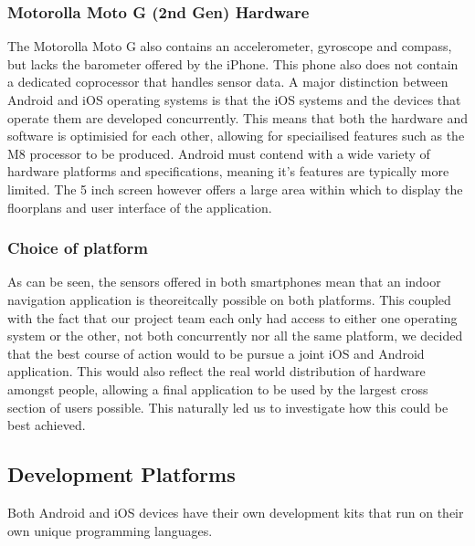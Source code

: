 \documentclass[main.tex]{subfiles}
\begin{document}
\subsubsection{Motorolla Moto G (2nd Gen) Hardware}

The Motorolla Moto G also contains an accelerometer, gyroscope and compass, but lacks the barometer offered by the iPhone. This phone also does not contain a dedicated coprocessor that handles sensor data. A major distinction between Android and iOS operating systems is that the iOS systems and the devices that operate them are developed concurrently. This means that both the hardware and software is optimisied for each other, allowing for speciailised features such as the M8 processor to be produced. Android must contend with a wide variety of hardware platforms and specifications, meaning it's features are typically more limited. The 5 inch screen however offers a large area within which to display the floorplans and user interface of the application.\\

\subsubsection{Choice of platform}

As can be seen, the sensors offered in both smartphones mean that an indoor navigation application is theoreitcally possible on both platforms. This coupled with the fact that our project team each only had access to either one operating system or the other, not both concurrently nor all the same platform, we decided that the best course of action would to be pursue a joint iOS and Android application. This would also reflect the real world distribution of hardware amongst people, allowing a final application to be used by the largest cross section of users possible. This naturally led us to investigate how this could be best achieved.\\

\subsection{Development Platforms}

Both Android and iOS devices have their own development kits that run on their own unique programming languages.
\end{document}
